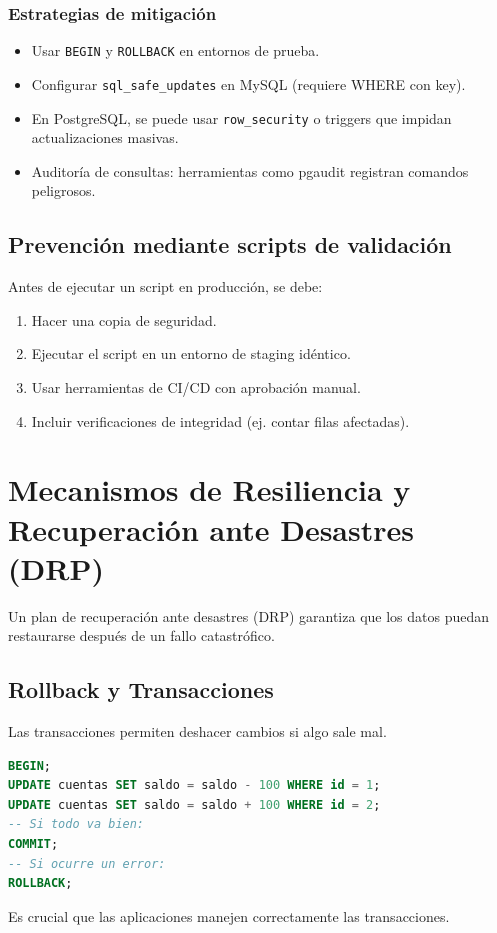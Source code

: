 \documentclass[12pt,a4paper,openany,oneside]{book}
\begin{document}
\subsection{Estrategias de mitigación}
\begin{itemize}
    \item Usar \texttt{BEGIN} y \texttt{ROLLBACK} en entornos de prueba.
    \item Configurar \texttt{sql\_safe\_updates} en MySQL (requiere WHERE con key).
    \item En PostgreSQL, se puede usar \texttt{row\_security} o triggers que impidan actualizaciones masivas.
    \item Auditoría de consultas: herramientas como pgaudit registran comandos peligrosos.
\end{itemize}

\section{Prevención mediante scripts de validación}
Antes de ejecutar un script en producción, se debe:
\begin{enumerate}
    \item Hacer una copia de seguridad.
    \item Ejecutar el script en un entorno de staging idéntico.
    \item Usar herramientas de CI/CD con aprobación manual.
    \item Incluir verificaciones de integridad (ej. contar filas afectadas).
\end{enumerate}

\chapter{Mecanismos de Resiliencia y Recuperación ante Desastres (DRP)}
Un plan de recuperación ante desastres (DRP) garantiza que los datos puedan restaurarse después de un fallo catastrófico.

\section{Rollback y Transacciones}
Las transacciones permiten deshacer cambios si algo sale mal.
\begin{lstlisting}[language=SQL]
BEGIN;
UPDATE cuentas SET saldo = saldo - 100 WHERE id = 1;
UPDATE cuentas SET saldo = saldo + 100 WHERE id = 2;
-- Si todo va bien:
COMMIT;
-- Si ocurre un error:
ROLLBACK;
\end{lstlisting}
Es crucial que las aplicaciones manejen correctamente las transacciones.
\end{document}
